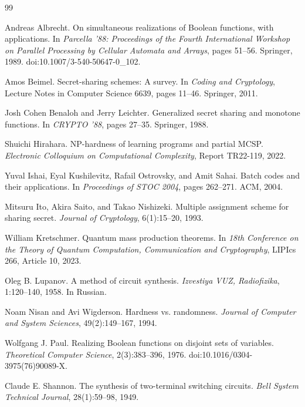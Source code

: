 \documentclass[11pt]{article}
\theoremstyle{definition}
\begin{document}
\begin{thebibliography}{99}

Andreas Albrecht.
\newblock On simultaneous realizations of Boolean functions, with applications.
\newblock In \emph{Parcella '88: Proceedings of the Fourth International Workshop on Parallel Processing by Cellular Automata and Arrays}, pages 51--56. Springer, 1989.
\newblock doi:10.1007/3-540-50647-0\_102.

Amos Beimel.
\newblock Secret-sharing schemes: A survey.
\newblock In \emph{Coding and Cryptology}, Lecture Notes in Computer Science 6639, pages 11--46. Springer, 2011.

Josh Cohen Benaloh and Jerry Leichter.
\newblock Generalized secret sharing and monotone functions.
\newblock In \emph{CRYPTO '88}, pages 27--35. Springer, 1988.

Shuichi Hirahara.
\newblock NP-hardness of learning programs and partial MCSP.
\newblock \emph{Electronic Colloquium on Computational Complexity}, Report TR22-119, 2022.

Yuval Ishai, Eyal Kushilevitz, Rafail Ostrovsky, and Amit Sahai.
\newblock Batch codes and their applications.
\newblock In \emph{Proceedings of STOC 2004}, pages 262--271. ACM, 2004.

Mitsuru Ito, Akira Saito, and Takao Nishizeki.
\newblock Multiple assignment scheme for sharing secret.
\newblock \emph{Journal of Cryptology}, 6(1):15--20, 1993.

William Kretschmer.
\newblock Quantum mass production theorems.
\newblock In \emph{18th Conference on the Theory of Quantum Computation, Communication and Cryptography}, LIPIcs 266, Article 10, 2023.

Oleg B. Lupanov.
\newblock A method of circuit synthesis.
\newblock \emph{Izvestiya VUZ, Radiofizika}, 1:120--140, 1958.  In Russian.

Noam Nisan and Avi Wigderson.
\newblock Hardness vs. randomness.
\newblock \emph{Journal of Computer and System Sciences}, 49(2):149--167, 1994.

Wolfgang J. Paul.
\newblock Realizing Boolean functions on disjoint sets of variables.
\newblock \emph{Theoretical Computer Science}, 2(3):383--396, 1976.
\newblock doi:10.1016/0304-3975(76)90089-X.

Claude E. Shannon.
\newblock The synthesis of two-terminal switching circuits.
\newblock \emph{Bell System Technical Journal}, 28(1):59--98, 1949.


\end{thebibliography}
\end{document}
